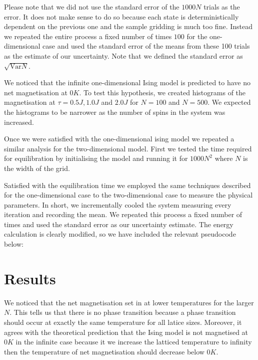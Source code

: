 \documentclass[a4paper, twocolumn]{article}
\begin{document}
Please note that we did not use the standard error of the %
\(1000N\) trials as the error. It does not make sense to do %
so because each state is deterministically dependent on the %
previous one and the sample gridding is much too fine. Instead %
we repeated the entire process a fixed number of times \(100\) for %
the one-dimensional case and used the standard error of the means %
from these 100 trials as the estimate of our uncertainty. Note that %
we defined the standard error as \(\sqrt{\textrm{Var}{N}}\). %


We noticed that the infinite one-dimensional Ising model is predicted %
to have no net magnetisation at \(0K\). To test this hypothesis, %
we created histograms of the magnetisation at \(\tau = 0.5J, 1.0J\) %
and \(2.0J\) for \(N = 100\) and \(N = 500\). We expected the %
histograms to be narrower as the number of spins in the system was %
increased.


Once we were satisfied with the one-dimensional ising model we %
repeated a similar analysis for the two-dimensional model. %
First we tested the time required for equilibration by initialising %
the model and running it for \(1000N^{2}\) where \(N\) is the width %
of the grid. 


Satisfied with the equilibration time we employed the same techniques %
described for the one-dimensional case to the two-dimensional case %
to measure the physical parameters. In short, we incrementally cooled %
the system measuring every iteration and recording the mean. We %
repeated this process a fixed number of times and used the standard %
error as our uncertainty estimate. The energy calculation is %
clearly modified, so we have included the relevant pseudocode %
below:
%


\section*{Results}
We noticed that the net magnetisation set in at lower temperatures for %
the larger \(N\). This tells us that there is no phase transition %
because a phase transition should occur at exactly the same %
temperature for all latice sizes. Moreover, it agrees with the %
theoretical prediction that the Ising model is not magnetised at %
\(0K\) in the infinite case because it we increase the latticed %
temperature to infinity then the temperature of net magnetisation %
should decrease below \(0K\). 
\end{document}
